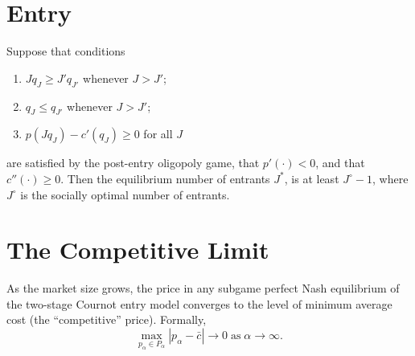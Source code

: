 \section{Entry}

\begin{prop}
    Suppose that conditions
    \begin{enumerate}[label=(A\arabic*)]
        \item $J q_J \geq J' q_{J'}$ whenever $J > J'$;
        \item $q_J \leq q_{J'}$ whenever $J > J'$;
        \item $p(J q_J) - c'(q_J) \geq 0$ for all $J$
    \end{enumerate}
    are satisfied by the post-entry oligopoly game, that $p'(\cdot) < 0$, and that $c''(\cdot) \geq 0$. Then the equilibrium number of entrants $J^*$, is at least $J^\circ - 1$, where $J^\circ$ is the socially optimal number of entrants.
\end{prop}


\section{The Competitive Limit}

\begin{prop}
    As the market size grows, the price in any subgame perfect Nash equilibrium of the two-stage Cournot entry model converges to the level of minimum average cost (the ``competitive'' price). Formally,
    \begin{equation*}
        \max_{p_\alpha \in P_\alpha} |p_\alpha - \bar{c}| \to 0 \; \text{as} \; \alpha \to \infty.
    \end{equation*}
\end{prop}
